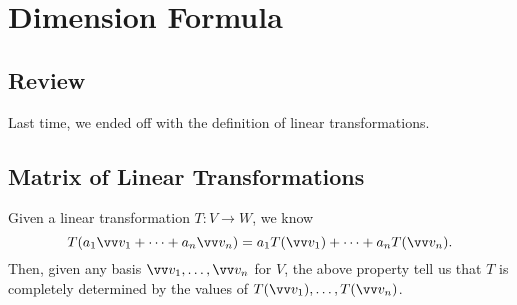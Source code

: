 
\section{Dimension Formula}
\subsection{Review}
Last time, we ended off with the definition of linear transformations.
\subsection{Matrix of Linear Transformations}
Given a linear transformation $T: V \rightarrow W$, we know 
\[ T(a_1 \vvv_1 + \cdots + a_n \vvv_n) = a_1 T(\vvv_1) + \cdots + a_n T(\vvv_n) .\]
Then, given any basis $\vvv_1, \ldots , \vvv_n$ for $V$, the above property tell us that $T$ is completely determined by the values of $T(\vvv_1), \ldots, T(\vvv_n)$. 


